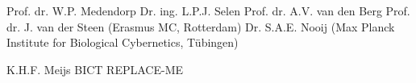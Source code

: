 \thispagestyle{empty}



\clearpage
\thispagestyle{empty}

\noindent {}
\noindent \npar Prof. dr. W.P. Medendorp
\npar
\noindent {}
\noindent \npar Dr. ing. L.P.J. Selen
\npar
\vspace{0.5cm}
\noindent {}
\noindent \npar Prof. dr. A.V. van den Berg
\noindent \npar Prof. dr. J. van der Steen (Erasmus MC, Rotterdam)
\noindent \npar Dr. S.A.E. Nooij (Max Planck Institute for Biological Cybernetics, T\"ubingen)

\vfill

\noindent {}
\noindent \npar K.H.F. Meijs BICT
\noindent \npar REPLACE-ME
